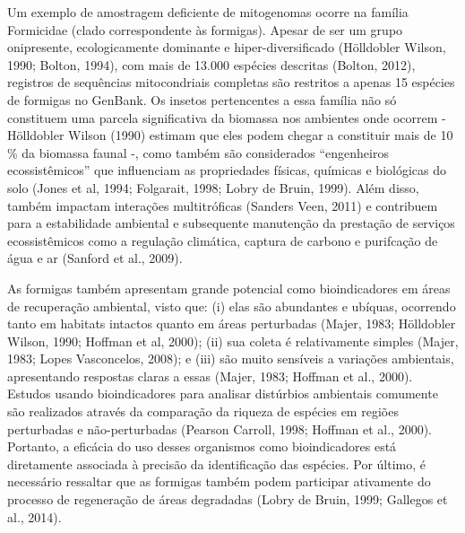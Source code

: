 \documentclass[../DISSERTACAO_MAIN.tex]{subfiles}
\begin{document}
Um exemplo de amostragem deficiente de mitogenomas ocorre na família Formicidae (clado correspondente às formigas). Apesar de ser um grupo onipresente, ecologicamente dominante e hiper-diversificado (Hölldobler  Wilson, 1990; Bolton, 1994), com mais de 13.000 espécies descritas (Bolton, 2012), registros de sequências mitocondriais completas são restritos a apenas 15 espécies de formigas no GenBank. Os insetos pertencentes a essa família não só constituem uma parcela significativa da biomassa nos ambientes onde ocorrem - Hölldobler  Wilson (1990) estimam que eles podem chegar a constituir mais de 10 \% da biomassa faunal -, como também são considerados “engenheiros ecossistêmicos” que influenciam as propriedades físicas, químicas e biológicas do solo (Jones et al, 1994; Folgarait, 1998; Lobry de Bruin, 1999). Além disso, também impactam interações multitróficas (Sanders  Veen, 2011) e contribuem para a estabilidade ambiental e subsequente manutenção da prestação de serviços ecossistêmicos como a regulação climática, captura de carbono e purifcação de água e ar (Sanford et al., 2009).

As formigas também apresentam grande potencial como bioindicadores em áreas de recuperação ambiental, visto que: (i) elas são abundantes e ubíquas, ocorrendo tanto em habitats intactos quanto em áreas perturbadas (Majer, 1983; Hölldobler  Wilson, 1990; Hoffman et al, 2000); (ii) sua coleta é relativamente simples (Majer, 1983; Lopes  Vasconcelos, 2008); e (iii) são muito sensíveis a variações ambientais, apresentando respostas claras a essas (Majer, 1983; Hoffman et al., 2000). Estudos usando bioindicadores para analisar distúrbios ambientais comumente são realizados através da comparação da riqueza de espécies em regiões perturbadas e não-perturbadas (Pearson  Carroll, 1998; Hoffman et al., 2000). Portanto, a eficácia do uso desses organismos como bioindicadores está diretamente associada à precisão da identificação das espécies. Por último, é necessário ressaltar que as formigas também podem participar ativamente do processo de regeneração de áreas degradadas (Lobry de Bruin, 1999; Gallegos et al., 2014).
\end{document}
